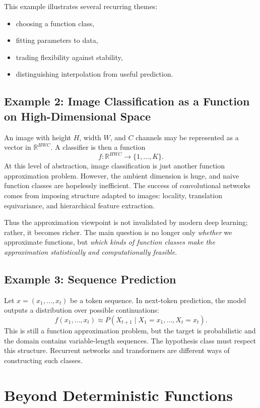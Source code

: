 This example illustrates several recurring themes:
\begin{itemize}
    \item choosing a function class,
    \item fitting parameters to data,
    \item trading flexibility against stability,
    \item distinguishing interpolation from useful prediction.
\end{itemize}

\subsection{Example 2: Image Classification as a Function on High-Dimensional Space}

An image with height $H$, width $W$, and $C$ channels may be represented as a vector in $\mathbb{R}^{HWC}$. A classifier is then a function
\[
f : \mathbb{R}^{HWC} \to \{1,\dots,K\}.
\]
At this level of abstraction, image classification is just another function approximation problem. However, the ambient dimension is huge, and naive function classes are hopelessly inefficient. The success of convolutional networks comes from imposing structure adapted to images: locality, translation equivariance, and hierarchical feature extraction.

Thus the approximation viewpoint is not invalidated by modern deep learning; rather, it becomes richer. The main question is no longer only \emph{whether} we approximate functions, but \emph{which kinds of function classes make the approximation statistically and computationally feasible}.

\subsection{Example 3: Sequence Prediction}

Let $x=(x_1,\dots,x_t)$ be a token sequence. In next-token prediction, the model outputs a distribution over possible continuations:
\[
f(x_1,\dots,x_t) \approx P(X_{t+1}\mid X_1=x_1,\dots,X_t=x_t).
\]
This is still a function approximation problem, but the target is probabilistic and the domain contains variable-length sequences. The hypothesis class must respect this structure. Recurrent networks and transformers are different ways of constructing such classes.

\section{Beyond Deterministic Functions}

